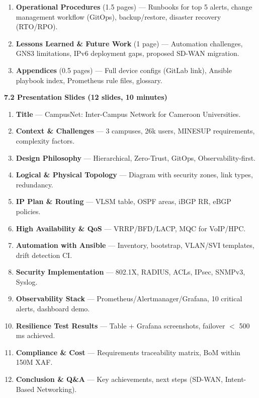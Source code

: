 \documentclass[11pt]{article}
\begin{document}
\begin{exoresolu}
\begin{enumerate}
    \item \textbf{Operational Procedures} (1.5 pages) — Runbooks for top 5 alerts, change management workflow (GitOps), backup/restore, disaster recovery (RTO/RPO).
    \item \textbf{Lessons Learned \& Future Work} (1 page) — Automation challenges, GNS3 limitations, IPv6 deployment gaps, proposed SD-WAN migration.
    \item \textbf{Appendices} (0.5 pages) — Full device configs (GitLab link), Ansible playbook index, Prometheus rule files, glossary.
\end{enumerate}

\textbf{7.2 Presentation Slides (12 slides, 10 minutes)}
\begin{enumerate}
    \item \textbf{Title} — CampusNet: Inter-Campus Network for Cameroon Universities.
    \item \textbf{Context \& Challenges} — 3 campuses, 26k users, MINESUP requirements, complexity factors.
    \item \textbf{Design Philosophy} — Hierarchical, Zero-Trust, GitOps, Observability-first.
    \item \textbf{Logical \& Physical Topology} — Diagram with security zones, link types, redundancy.
    \item \textbf{IP Plan \& Routing} — VLSM table, OSPF areas, iBGP RR, eBGP policies.
    \item \textbf{High Availability \& QoS} — VRRP/BFD/LACP, MQC for VoIP/HPC.
    \item \textbf{Automation with Ansible} — Inventory, bootstrap, VLAN/SVI templates, drift detection CI.
    \item \textbf{Security Implementation} — 802.1X, RADIUS, ACLs, IPsec, SNMPv3, Syslog.
    \item \textbf{Observability Stack} — Prometheus/Alertmanager/Grafana, 10 critical alerts, dashboard demo.
    \item \textbf{Resilience Test Results} — Table + Grafana screenshots, failover $<$ 500\,ms achieved.
    \item \textbf{Compliance \& Cost} — Requirements traceability matrix, BoM within 150M XAF.
    \item \textbf{Conclusion \& Q\&A} — Key achievements, next steps (SD-WAN, Intent-Based Networking).
\end{enumerate}


\end{exoresolu}
\end{document}
